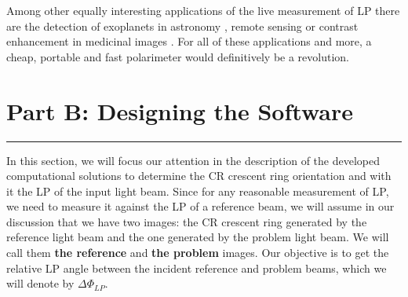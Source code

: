 \documentclass[11pt, a4paper, twoside]{article} %
\begin{document}
Among other equally interesting applications of the live measurement of LP there are the detection of exoplanets in astronomy \cite{exoplanets}, remote sensing \cite{remote} or contrast enhancement in medicinal images \cite{contrast}. For all of these applications and more, a cheap, portable and fast polarimeter would definitively be a revolution.


\newpage


\fancyhead[OR]{ }
\fancyhead[EL]{}
\fancyhead[OL]{ }
\fancyhead[ER]{}

\newpage





\newpage


\fancyhead[L]{\null}
\fancyhead[R]{\null}


\section*{\centering \huge{Part B: Designing the Software}\vspace{-0.3cm}}
\noindent\rule{\textwidth}{0.4pt}

In this section, we will focus our attention in the description of the developed computational solutions to determine the CR crescent ring orientation and with it the LP of the input light beam. Since for any reasonable measurement of LP, we need to measure it against the LP of a reference beam, we will assume in our discussion that we have two images: the CR crescent ring generated by the reference light beam and the one generated by the problem light beam. We will call them {\bf the reference} and {\bf the problem} images. Our objective is to get the relative LP angle between the incident reference and problem beams, which we will denote by $\Delta \Phi_{LP}$.
\end{document}
